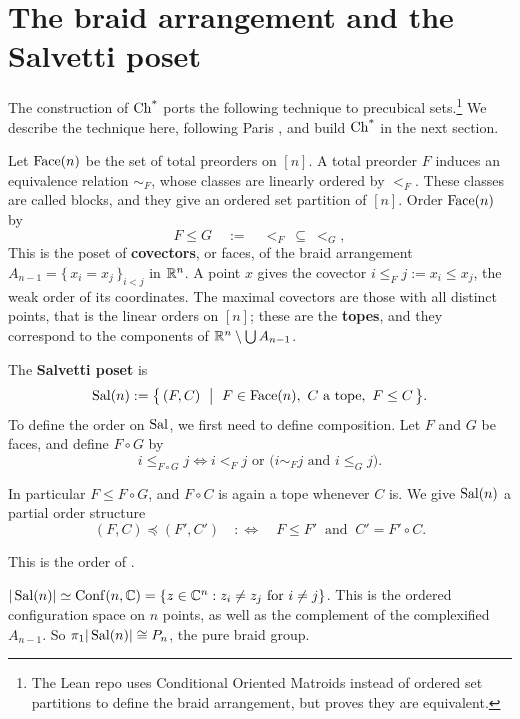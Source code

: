 \documentclass[11pt]{article}
\begin{document}
\section{The braid arrangement and the Salvetti poset}\label{sec:arrangement}

The construction of $\operatorname{Ch^*}$ ports the following technique to precubical sets.\footnote{
  The Lean repo uses Conditional Oriented Matroids instead of ordered set partitions to define the braid
  arrangement, but proves they are equivalent.
}
We describe the technique here, following Paris \cite{Paris}, and build $\operatorname{Ch^*}$ in the next section.

Let $\operatorname{Face}(n)$ be the set of total preorders on $[n]$. A total preorder $F$
induces an equivalence relation $\sim_F$, whose classes are linearly ordered by $<_F$.
These classes are called blocks, and they give an ordered set partition of $[n]$.
Order $\operatorname{Face}(n)$ by
\[
  F \leq G \quad:=\quad {<_F} \ \subseteq\ {<_G},
\]
This is the poset of \textbf{covectors}, or faces, of the braid arrangement 
$A_{n-1} = \{\,x_i = x_j \,\}_{i < j}$ in $\mathbb{R}^n$. A point $x$ gives
the covector $i \leq_F j := x_i \leq x_j$, the weak order of its coordinates. The maximal
covectors are those with all distinct points, that is the linear orders on $[n]$; these are the \textbf{topes},
and they correspond to the components of $\mathbb{R}^n \setminus \bigcup A_{n-1}$.

\begin{definition}\label{def:sal}
The \textbf{Salvetti poset} is
\[
  \operatorname{Sal}(n) := \bigl\{\, (F, C) \ \bigm|\ F \in \operatorname{Face}(n),\ C \text{ a tope},\ F \leq C \,\bigr\}.
\]
To define the order on $\operatorname{Sal}$, we first need to define composition. Let $F$ and $G$ be faces, and define $F \circ G$ by
\[
  i \leq_{F \circ G} j \iff i <_F j \text{ or } \big( i \sim_F j  \text{ and } i \leq_G j \big).
\]

In particular $F \leq F \circ G$, and $F \circ C$ is again a tope whenever $C$ is. 
We give $\operatorname{Sal}(n)$ a partial order structure
\[
  (F, C) \preceq (F', C') \quad:\!\iff\quad F \leq F' \ \text{ and }\ C' = F' \circ C.
\]
\end{definition}

This is the order of \cite[\S3.1]{Paris}.

\begin{theorem}\label{thm:salvetti}
  $|\operatorname{Sal}(n)| \simeq \operatorname{Conf}(n,\mathbb{C}) = \{z \in \mathbb{C}^n : z_i \neq z_j \text{ for } i \neq j\}$. 
  This is the ordered configuration space on $n$ points, as well as the complement of the complexified $A_{n-1}$.
  So $\pi_1|\operatorname{Sal}(n)| \cong P_n$, the pure braid group.
\end{theorem}
\end{document}
